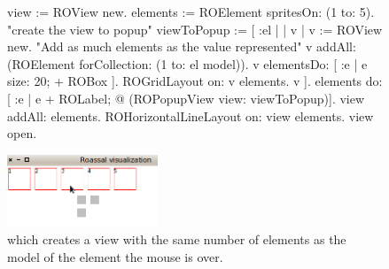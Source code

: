 \documentclass[a4paper,10pt,twoside]{book}
\begin{document}
\begin{figure}[H]
      \begin{minipage}[t]{1\textwidth}
      \vspace{0pt}
     \begin{code}{}
view := ROView new.
elements := ROElement spritesOn: (1 to: 5).
"create the view to popup"
viewToPopup := [ :el | | v | 
	              	              v := ROView new.
	              	              "Add as much elements as the value represented"
	              	              v addAll: (ROElement forCollection: (1 to: el model)).
	              	              v elementsDo: [ :e | e size: 20; + ROBox ].
	              	              ROGridLayout on: v elements.
	              	              v ].
elements do: [ :e | e + ROLabel;  @ (ROPopupView view: viewToPopup)].
view addAll: elements.
ROHorizontalLineLayout on: view elements.
view open.
\end{code}
\end{minipage}\hfill\begin{minipage}[t]{1\textwidth}
	 \vspace{0pt} \raggedright
       \centering
		\includegraphics[width=0.4\textwidth]{popupView3}
   \end{minipage}
\label{fig:popupView}
\caption{ which creates a view with the same number of elements as the model of the element the mouse is over.}
\end{figure} 


%
%	
\end{document}
